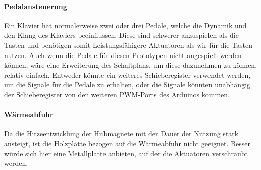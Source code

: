 \paragraph{Pedalansteuerung}
Ein Klavier hat normalerweise zwei oder drei Pedale, welche die Dynamik und den Klang des Klaviers beeinflussen.
Diese sind schwerer anzuspielen als die Tasten und benötigen somit Leistungsfähigere Aktuatoren als wir für die Tasten nutzen. %
Auch wenn die Pedale für diesen Prototypen nicht angespielt werden können, wäre eine Erweiterung des Schaltplans, um diese dazunehmen zu können, relativ einfach.
Entweder könnte ein weiteres Schieberegister verwendet werden, um die Signale für die Pedale zu erhalten, oder die Signale könnten unabhängig der Schieberegister von den weiteren \ac{PWM}-Ports des Arduinos kommen.

\paragraph{Wärmeabfuhr}
Da die Hitzeentwicklung der Hubmagnete mit der Dauer der Nutzung stark ansteigt, ist die Holzplatte bezogen auf die Wärmeabfuhr nicht geeignet.
Besser würde sich hier eine Metallplatte anbieten, auf der die Aktuatoren verschraubt werden.

